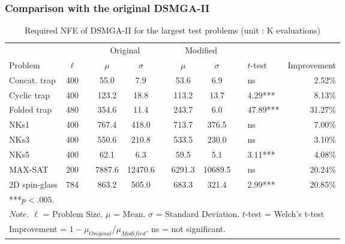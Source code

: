 \documentclass{sig-alternate-05-2015}
\begin{document}
\subsubsection{ Comparison with the original DSMGA-II }

\begin{table}[ht]
\centering
\label{my-label}
\begin{tabular}{lclcclccllr}
\hline
              &        &  & \multicolumn{2}{c}{Original} &  & \multicolumn{2}{c}{Modified} &  &        		&         		\\ \cline{4-5} \cline{7-8}
Problem       & $\ell$ &  & $\mu$        & $\sigma$      &  & $\mu$        & $\sigma$      &  & $t$-test	& Improvement  \\ \hline
Concat. trap  & 400    &  & 55.0         & 7.9           &  & 53.6         & 6.9           &  & ns     		& 2.52\%  \\
Cyclic trap   & 400    &  & 123.2        & 18.8          &  & 113.2        & 13.7          &  & 4.29***  	& 8.13\%  \\
Folded trap   & 480    &  & 354.6        & 11.4          &  & 243.7        & 6.0           &  & 47.89*** 	& 31.27\% \\
NKs1          & 400    &  & 767.4        & 418.0         &  & 713.7        & 376.5         &  & ns     		& 7.00\%  \\
NKs3          & 400    &  & 550.6        & 210.8         &  & 533.5        & 230.0         &  & ns  	   	& 3.10\%  \\
NKs5          & 400    &  & 62.1         & 6.3           &  & 59.5         & 5.1           &  & 3.11***  	& 4.08\%  \\
MAX-SAT       & 200    &  & 7887.6       & 12470.6       &  & 6291.3       & 10689.5       &  & ns    		& 20.24\% \\
2D spin-glass & 784    &  & 863.2        & 505.0         &  & 683.3        & 321.4         &  & 2.99***	   & 20.85\% \\ 
\hline 
***$p<.005$. \\
\multicolumn{11}{l}{$Note.$ $\ell$ = Problem Size. $\mu$ = Mean. $\sigma$ = Standard Deviation. $t$-test = Welch's t-test} \\
\multicolumn{11}{l}{Improvement = $1 - \mu_{Original}/\mu_{Modified}$. ns = not significant.}
\end{tabular}
\caption{Required NFE of DSMGA-II for the largest test problems (unit : K evaluations)}
\end{table}
\end{document}
